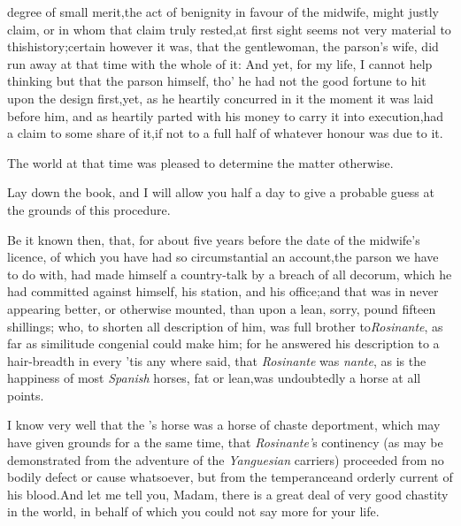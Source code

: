 \documentclass{article}
\begin{document}
 degree of small merit,\break the
act of benignity in favour of the midwife, might justly claim, or in
whom that claim truly rested,\tsk  at first sight seems not very
material to this\break history;\tsh  certain however it was, that
the gentlewoman, the parson’s wife, did run away at that time
with the whole of it: And yet, for my life, I cannot help thinking
but that the parson himself, tho’ he had not the good fortune to
hit upon the design first,\tsk  yet, as he heartily concurred in
it the moment it was laid before him, and as heartily parted with\break
his money to carry it into execution,\break had a claim to some share of
it,\tsk  if not to a full half of whatever honour was due to
it.

The world at that time was pleased to determine the matter
otherwise.

Lay down the book, and I will allow you half a day to give a
probable guess at the grounds of this procedure.

Be it known then, that, for about five years before the date of
the midwife’s licence, of which you have had so
circumstantial an account,\tsk  the parson we have to do with, had
made himself a country-talk by a breach of all decorum, which he
had committed against himself, his station, and his
office;\tsk  and that was in never appearing better, or otherwise
mounted, than upon a lean, sorry,\break
{}
pound fifteen shillings; who, to shorten all description of
him, was full brother to\break \textit{Rosinante}, as far as similitude
congenial could make him; for he answered his\break
description to a hair-breadth in every\break
{}
’tis any where said, that \textit{Rosinante} was 
\textit{nante}, as is the happiness of most
\textit{Spanish} horses, fat or lean,\tsk  was undoubtedly a horse
at all points.

I know very well that the ’s\break
horse was a horse of chaste deportment, which may
have given grounds for a 
the same time, that \textit{Rosinante’}s continen\-cy (as may
be demonstrated from the adventure of the \textit{Yanguesian}
carriers) proceeded from no bodily defect or cause whatsoever, but
from the temperance\break and orderly current of his blood.\tsk  And\break
let me tell you, Madam, there is a great deal of very good chastity in the world, in
behalf of which you could not say more for your life.
\end{document}
